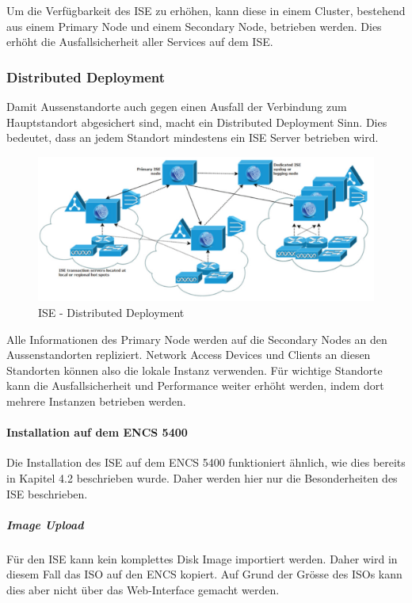 Um die Verfügbarkeit des ISE zu erhöhen, kann diese in einem Cluster, bestehend aus einem Primary Node und einem Secondary Node, betrieben werden. Dies erhöht die Ausfallsicherheit aller Services auf dem ISE.

\subsubsection{Distributed Deployment}

Damit Aussenstandorte auch gegen einen Ausfall der Verbindung zum Hauptstandort abgesichert sind, macht ein Distributed Deployment Sinn. Dies bedeutet, dass an jedem Standort mindestens ein ISE Server betrieben wird. 

\begin{figure}[H]
	\centering
	\includegraphics[width=0.8\linewidth]{img/Absicherung/ISE-Distributed-Deployment.png}
	\caption{ISE - Distributed Deployment \cite{ise-install-guide}}
	\label{fig:ISE - Distributed Deployment}
\end{figure}

Alle Informationen des Primary Node werden auf die Secondary Nodes an den Aussenstandorten repliziert. Network Access Devices und Clients an diesen Standorten können also die lokale Instanz verwenden.  Für wichtige Standorte kann die Ausfallsicherheit und Performance weiter erhöht werden, indem dort mehrere Instanzen betrieben werden.

\paragraph{Installation auf dem ENCS 5400}

Die Installation des ISE auf dem ENCS 5400 funktioniert ähnlich, wie dies bereits in Kapitel 4.2 beschrieben wurde. Daher werden hier nur die Besonderheiten des ISE beschrieben.

\subparagraph{Image Upload}
Für den ISE kann kein komplettes Disk Image importiert werden. Daher wird in diesem Fall das ISO auf den ENCS kopiert. Auf Grund der Grösse des ISOs kann dies aber nicht über das Web-Interface gemacht werden.

